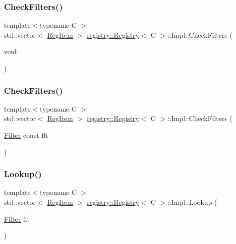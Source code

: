 \subsubsection{\texorpdfstring{Check\+Filters()}{CheckFilters()}\hspace{0.1cm}{\footnotesize\ttfamily [1/2]}}
{\footnotesize\ttfamily template$<$typename C $>$ \\
std\+::vector$<$ \hyperlink{classregistry_1_1RegItem}{Reg\+Item} $>$ \hyperlink{classregistry_1_1Registry}{registry\+::\+Registry}$<$ C $>$\+::Impl\+::\+Check\+Filters (\begin{DoxyParamCaption}\item[{void}]{ }\end{DoxyParamCaption})\hspace{0.3cm}{\ttfamily [private]}}

\mbox{\label{classregistry_1_1Registry_1_1Impl_a789ef808ca82b58f30d56de1543de6a3}} 
\subsubsection{\texorpdfstring{Check\+Filters()}{CheckFilters()}\hspace{0.1cm}{\footnotesize\ttfamily [2/2]}}
{\footnotesize\ttfamily template$<$typename C $>$ \\
std\+::vector$<$ \hyperlink{classregistry_1_1RegItem}{Reg\+Item} $>$ \hyperlink{classregistry_1_1Registry}{registry\+::\+Registry}$<$ C $>$\+::Impl\+::\+Check\+Filters (\begin{DoxyParamCaption}\item[{\hyperlink{classregistry_1_1Filter}{Filter} const}]{flt }\end{DoxyParamCaption})\hspace{0.3cm}{\ttfamily [private]}}

\mbox{\label{classregistry_1_1Registry_1_1Impl_ad31604a9866736b72747d185a26e212e}} 
\subsubsection{\texorpdfstring{Lookup()}{Lookup()}}
{\footnotesize\ttfamily template$<$typename C $>$ \\
std\+::vector$<$ \hyperlink{classregistry_1_1RegItem}{Reg\+Item} $>$ \hyperlink{classregistry_1_1Registry}{registry\+::\+Registry}$<$ C $>$\+::Impl\+::\+Lookup (\begin{DoxyParamCaption}\item[{\hyperlink{classregistry_1_1Filter}{Filter}}]{flt }\end{DoxyParamCaption})\hspace{0.3cm}{\ttfamily [inline]}}

